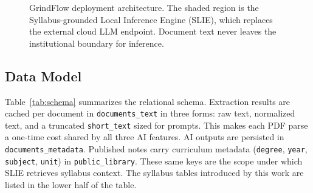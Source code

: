 \documentclass[conference]{IEEEtran}
\begin{document}
\begin{figure}[t]
\caption{GrindFlow deployment architecture. The shaded region is the
Syllabus-grounded Local Inference Engine (SLIE), which replaces the external
cloud LLM endpoint. Document text never leaves the institutional boundary for
inference.}
\label{fig:arch}
\end{figure}

\subsection{Data Model}
Table~\ref{tab:schema} summarizes the relational schema. Extraction results
are cached per document in \texttt{documents\_text} in three forms: raw text,
normalized text, and a truncated \texttt{short\_text} sized for prompts. This
makes each PDF parse a one-time cost shared by all three AI features. AI
outputs are persisted in \texttt{documents\_metadata}. Published notes carry
curriculum metadata (\texttt{degree}, \texttt{year}, \texttt{subject},
\texttt{unit}) in \texttt{public\_library}. These same keys are the scope
under which SLIE retrieves syllabus context. The syllabus tables introduced
by this work are listed in the lower half of the table.
\end{document}
